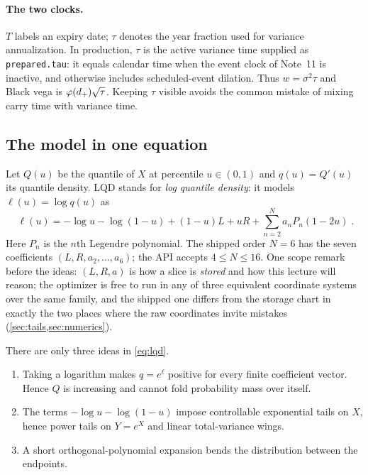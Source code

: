 \documentclass[11pt]{article}
\begin{document}
\paragraph{The two clocks.}
$T$ labels an expiry date; $\tau$ denotes the year fraction used for variance
annualization.  In production, $\tau$ is the active variance time supplied as
\texttt{prepared.tau}: it equals calendar time when the event clock of Note~11
is inactive, and otherwise includes scheduled-event dilation.  Thus
$w=\sigma^2\tau$ and Black vega is $\varphi(d_+)\sqrt{\tau}$.  Keeping $\tau$
visible avoids the common mistake of mixing carry time with variance time.

\subsection{The model in one equation}

Let $Q(u)$ be the quantile of $X$ at percentile $u\in(0,1)$ and
$q(u)=Q'(u)$ its quantile density.  LQD stands for
\emph{log quantile density}: it models $\ell(u)=\log q(u)$ as
\begin{equation}
\boxed{\;
\ell(u)=-\log u-\log(1-u)+(1-u)L+uR
       +\sum_{n=2}^{N}a_nP_n(1-2u)\; .}
\label{eq:lqd}
\end{equation}
Here $P_n$ is the $n$th Legendre polynomial.  The shipped order $N=6$ has the
seven coefficients $(L,R,a_2,\ldots,a_6)$; the API accepts
$4\le N\le16$.  One scope remark before the ideas: $(L,R,a)$ is how a slice
is \emph{stored} and how this lecture will reason; the optimizer is free to
run in any of three equivalent coordinate systems over the same family, and
the shipped one differs from the storage chart in exactly the two places
where the raw coordinates invite mistakes (\cref{sec:tails,sec:numerics}).

There are only three ideas in \eqref{eq:lqd}.
\begin{enumerate}[leftmargin=1.6em]
\item Taking a logarithm makes $q=e^\ell$ positive for every finite coefficient
vector.  Hence $Q$ is increasing and cannot fold probability mass over itself.
\item The terms $-\log u-\log(1-u)$ impose controllable exponential tails on
$X$, hence power tails on $Y=e^X$ and linear total-variance wings.
\item A short orthogonal-polynomial expansion bends the distribution between
the endpoints.
\end{enumerate}
\end{document}
